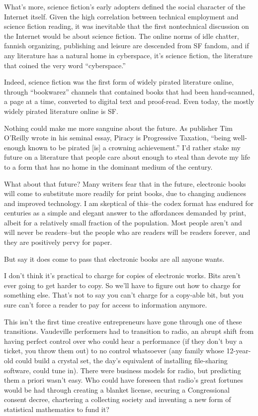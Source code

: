 What's more, science fiction's early adopters defined the social
character of the Internet itself. Given the high correlation
between technical employment and science fiction reading, it was
inevitable that the first nontechnical discussion on the Internet
would be about science fiction. The online norms of idle chatter,
fannish organizing, publishing and leisure are descended from SF
fandom, and if any literature has a natural home in cyberspace,
it's science fiction, the literature that coined the very word
``cyberspace.''

Indeed, science fiction was the first form of widely pirated
literature online, through ``bookwarez'' channels that contained
books that had been hand-scanned, a page at a time, converted to
digital text and proof-read. Even today, the mostly widely pirated
literature online is SF.

Nothing could make me more sanguine about the future. As publisher
Tim O'Reilly wrote in his seminal essay, Piracy is Progressive
Taxation, ``being well-enough known to be pirated [is] a crowning
achievement.'' I'd rather stake my future on a literature that
people care about enough to steal than devote my life to a form
that has no home in the dominant medium of the century.

What about that future? Many writers fear that in the future,
electronic books will come to substitute more readily for print
books, due to changing audiences and improved technology. I am
skeptical of this--the codex format has endured for centuries as a
simple and elegant answer to the affordances demanded by print,
albeit for a relatively small fraction of the population. Most
people aren't and will never be readers--but the people who are
readers will be readers forever, and they are positively pervy for
paper.

But say it does come to pass that electronic books are all anyone
wants.

I don't think it's practical to charge for copies of electronic
works. Bits aren't ever going to get harder to copy. So we'll have
to figure out how to charge for something else. That's not to say
you can't charge for a copy-able bit, but you sure can't force a
reader to pay for access to information anymore.

This isn't the first time creative entrepreneurs have gone through
one of these transitions. Vaudeville performers had to transition
to radio, an abrupt shift from having perfect control over who
could hear a performance (if they don't buy a ticket, you throw
them out) to no control whatsoever (any family whose 12-year-old
could build a crystal set, the day's equivalent of installing
file-sharing software, could tune in). There were business models
for radio, but predicting them a priori wasn't easy. Who could have
foreseen that radio's great fortunes would be had through creating
a blanket license, securing a Congressional consent decree,
chartering a collecting society and inventing a new form of
statistical mathematics to fund it?


